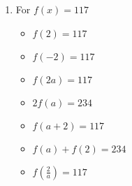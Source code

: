 \begin{enumerate}
\begin{multicols}{3}
\begin{itemize}
\end{itemize}
\end{multicols}

\begin{multicols}{3}
\begin{itemize}

\item  $f \left( \frac{2}{a} \right) = \sqrt{\frac{4}{a} + 1}$ \\
$\hphantom{f \left( \frac{2}{a} \right)} = \sqrt{\frac{a+4}{a}}$

\vfill

\columnbreak

\item $\frac{f(a)}{2} = \frac{\sqrt{2a+1}}{2}$

\vfill

\columnbreak


\item  $f(a + h) = \sqrt{2a+2h+1}$

\end{itemize}
\end{multicols}


\item For $f(x) = 117$

\begin{multicols}{3}
\begin{itemize}

\item  $f(2) = 117$
\item  $f(-2) = 117$
\item  $f(2a) = 117$

\end{itemize}
\end{multicols}

\begin{multicols}{3}
\begin{itemize}

\item  $2 f(a) = 234$
\item $f(a+2) = 117$
\item $f(a) + f(2) = 234$

\end{itemize}
\end{multicols}

\begin{multicols}{3}
\begin{itemize}

\item  $f \left( \frac{2}{a} \right) = 117$ 


\end{itemize}
\end{multicols}
\end{enumerate}
